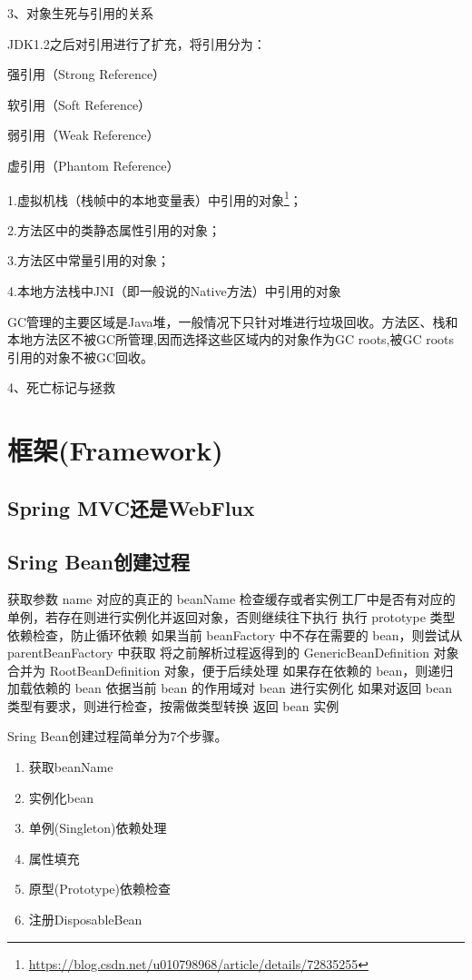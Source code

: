 \documentclass[../../../interview-questions.tex]{subfiles}
\begin{document}
3、对象生死与引用的关系

JDK1.2之后对引用进行了扩充，将引用分为：

强引用（Strong Reference）

软引用（Soft Reference）

弱引用（Weak Reference）

虚引用（Phantom Reference）

1.虚拟机栈（栈帧中的本地变量表）中引用的对象\footnote{\url{https://blog.csdn.net/u010798968/article/details/72835255}}；

2.方法区中的类静态属性引用的对象；

3.方法区中常量引用的对象；

4.本地方法栈中JNI（即一般说的Native方法）中引用的对象

GC管理的主要区域是Java堆，一般情况下只针对堆进行垃圾回收。方法区、栈和本地方法区不被GC所管理,因而选择这些区域内的对象作为GC roots,被GC roots引用的对象不被GC回收。


4、死亡标记与拯救



\section{框架(Framework)}

\subsection{Spring MVC还是WebFlux}

\subsection{Sring Bean创建过程}

获取参数 name 对应的真正的 beanName
检查缓存或者实例工厂中是否有对应的单例，若存在则进行实例化并返回对象，否则继续往下执行
执行 prototype 类型依赖检查，防止循环依赖
如果当前 beanFactory 中不存在需要的 bean，则尝试从 parentBeanFactory 中获取
将之前解析过程返得到的 GenericBeanDefinition 对象合并为 RootBeanDefinition 对象，便于后续处理
如果存在依赖的 bean，则递归加载依赖的 bean
依据当前 bean 的作用域对 bean 进行实例化
如果对返回 bean 类型有要求，则进行检查，按需做类型转换
返回 bean 实例


Sring Bean创建过程简单分为7个步骤。

\begin{enumerate}
\item{获取beanName}
\item{实例化bean}
\item{单例(Singleton)依赖处理}
\item{属性填充}
\item{原型(Prototype)依赖检查}
\item{注册DisposableBean}
\end{enumerate}
\end{document}
